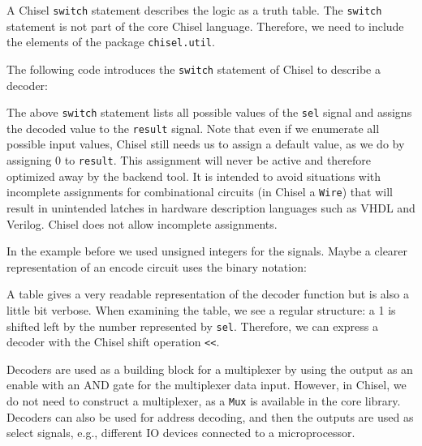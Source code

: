 \documentclass[%
    10pt,
    headinclude, footexclude,
    openright, %
    notitlepage,
    cleardoubleempty,
    headsepline,
    pointlessnumbers,
    bibtotoc, idxtotoc,
    ]{scrbook}
\newcommand{\code}[1]{{\small{\texttt{#1}}}}
\newcommand{\todo}[1]{{\emph{TODO: #1}}}
\renewcommand{\todo}[1]{}
\begin{document}
A Chisel \code{switch} statement describes the logic as a truth table.
The \code{switch} statement is not part of the core Chisel language.
Therefore, we need to include the elements of the package \code{chisel.util}.


\noindent The following code introduces the \code{switch} statement of Chisel to describe a decoder:



\noindent The above \code{switch} statement lists all possible values of the \code{sel} signal
and assigns the decoded value to the \code{result} signal.
Note that even if we enumerate all possible input values, Chisel still needs us to assign a
default value, as we do by assigning 0 to \code{result}.
This assignment will never be active and therefore optimized away by the backend tool.
It is intended to avoid situations with incomplete assignments for combinational circuits
(in Chisel a \code{Wire}) that will result in unintended latches in hardware description
languages such as VHDL and Verilog. Chisel does not allow incomplete assignments.

In the example before we used unsigned integers for the signals. Maybe a clearer representation
of an encode circuit uses the binary notation:


\todo{from Luca: for very small examples. What if the one-hot input is 256 wires? Can Chisel capture that? Or I need 256 lines? I would suggest to put an additional example. Maybe there is something like the for loop in VHDL.}

A table gives a very readable representation of the decoder function but is also
a little bit verbose.
When examining the table, we see a regular structure: a 1 is shifted left by the number
represented by \code{sel}. Therefore, we can express a decoder with the Chisel shift
operation \code{<<}.


Decoders are used as a building block for a multiplexer by using the output as an enable
with an AND gate for the multiplexer data input. However, in Chisel, we do not need to construct
a multiplexer, as a \code{Mux} is available in the core library.
Decoders can also be used for address decoding, and then the outputs are used as
select signals, e.g., different IO devices connected to a microprocessor. 
\end{document}
